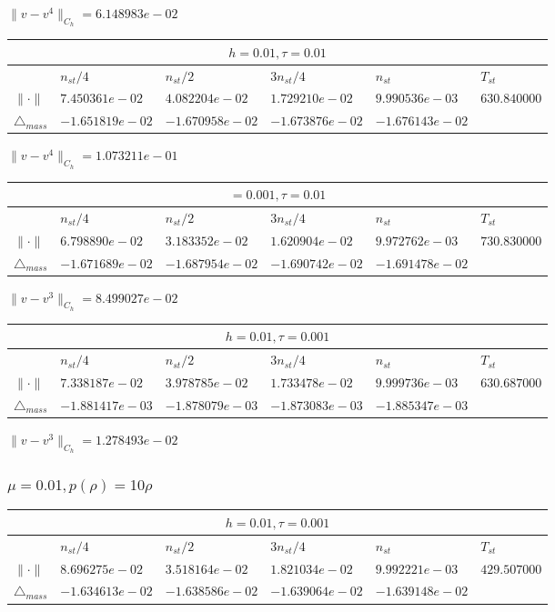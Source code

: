 $\|v-v^{4}\|_{C_h} = 6.148983e-02$


\begin{tabular}{*{6}{|l}|}
    \hline
     \\
    \hline
    &$n_{st}/4 $&$ n_{st}/2$&$3n_{st}/4$&$n_{st}$&$T_{st}$ \\
    \hline
$\|\cdot \|$& $7.450361e-02$ & $4.082204e-02$ & $1.729210e-02$ & $9.990536e-03$ &$630.840000$\\
\hline
$\triangle_{mass}$& $-1.651819e-02$ & $-1.670958e-02$ & $-1.673876e-02$ & $-1.676143e-02$ &\\
\hline
\end{tabular}

$\|v-v^{4}\|_{C_h} = 1.073211e-01$


\begin{tabular}{*{6}{|l}|}
    \hline
     \\
    \hline
    &$n_{st}/4 $&$ n_{st}/2$&$3n_{st}/4$&$n_{st}$&$T_{st}$ \\
    \hline
    $\|\cdot \|$& $6.798890e-02$ & $3.183352e-02$ & $1.620904e-02$ & $9.972762e-03$ &$730.830000$\\
\hline
$\triangle_{mass}$& $-1.671689e-02$ & $-1.687954e-02$ & $-1.690742e-02$ & $-1.691478e-02$ &\\
\hline
\end{tabular}

$\|v-v^{3}\|_{C_h} = 8.499027e-02$


\begin{tabular}{*{6}{|l}|}
    \hline
     \\
    \hline
    &$n_{st}/4 $&$ n_{st}/2$&$3n_{st}/4$&$n_{st}$&$T_{st}$ \\
    \hline
$\|\cdot \|$& $7.338187e-02$ & $3.978785e-02$ & $1.733478e-02$ & $9.999736e-03$ &$630.687000$\\
\hline
$\triangle_{mass}$& $-1.881417e-03$ & $-1.878079e-03$ & $-1.873083e-03$ & $-1.885347e-03$ &\\
\hline
\end{tabular}

$\|v-v^{3}\|_{C_h} = 1.278493e-02$

\subsubsection{$\mu = 0.01, p(\rho) = 10\rho $}

\begin{tabular}{*{6}{|l}|}
    \hline
     \\
    \hline
    &$n_{st}/4 $&$ n_{st}/2$&$3n_{st}/4$&$n_{st}$&$T_{st}$ \\
    \hline
    $\|\cdot \|$& $8.696275e-02$ & $3.518164e-02$ & $1.821034e-02$ & $9.992221e-03$ &$429.507000$\\
\hline
$\triangle_{mass}$& $-1.634613e-02$ & $-1.638586e-02$ & $-1.639064e-02$ & $-1.639148e-02$ &\\
\hline
\end{tabular}

